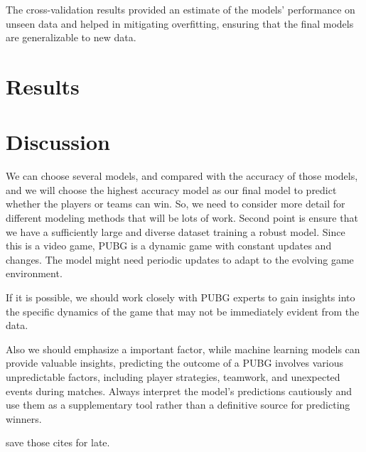 \documentclass[12pt]{article}
\begin{document}
The cross-validation results provided an estimate of the models' performance on unseen data and helped in mitigating overfitting, ensuring that the final models are generalizable to new data.







\section{Results}
\label{sec:resu}







\section{Discussion}
\label{sec:disc}

We can choose several models, and compared with the accuracy of those models, and we will choose the highest accuracy model as our final model to predict whether the players or teams can win. So, we need to consider more detail for different modeling methods that will be lots of work.
Second point is ensure that we have a sufficiently large and diverse dataset training a robust model.
Since this is a video game, PUBG is a dynamic game with constant updates and changes. The model might need periodic updates to adapt to the evolving game environment.

If it is possible, we should work closely with PUBG experts to gain insights into the specific dynamics of the game that may not be immediately evident from the data.

Also we should emphasize a important factor, while machine learning models can provide valuable insights, predicting the outcome of a PUBG  involves various unpredictable factors, including player strategies, teamwork, and unexpected events during matches. Always interpret the model's predictions cautiously and use them as a supplementary tool rather than a definitive source for predicting winners.


\citet{aggarwal2021rank}
\citet{liu2020two}
\citet{ghazali2021esports}

save those cites for late.




\end{document}
